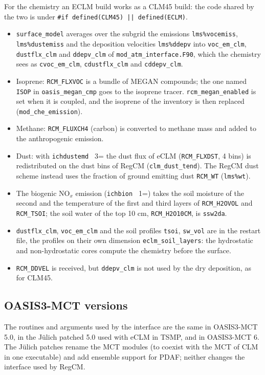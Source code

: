 For the chemistry an ECLM build works as a CLM45 build: the code shared by
the two is under \verb=#if defined(CLM45) || defined(ECLM)=.
\begin{itemize}
  \item \verb=surface_model= averages over the subgrid the emissions
        \verb=lms%vocemiss=, \verb=lms%dustemiss= and the deposition
        velocities \verb=lms%ddepv= into \verb=voc_em_clm=,
        \verb=dustflx_clm= and \verb=ddepv_clm= of
        \verb=mod_atm_interface.F90=, which the chemistry sees as
        \verb=cvoc_em_clm=, \verb=cdustflx_clm= and \verb=cddepv_clm=.
  \item Isoprene: \verb=RCM_FLXVOC= is a bundle of MEGAN compounds; the one
        named \verb=ISOP= in \verb=oasis_megan_cmp= goes to the isoprene
        tracer. \verb=rcm_megan_enabled= is set when it is coupled, and the
        isoprene of the inventory is then replaced (\verb=mod_che_emission=).
  \item Methane: \verb=RCM_FLUXCH4= (carbon) is converted to methane mass
        and added to the anthropogenic emission.
  \item Dust: with \verb=ichdustemd = 3= the dust flux of eCLM
        (\verb=RCM_FLXDST=, 4 bins) is redistributed on the dust bins of
        RegCM (\verb=clm_dust_tend=). The RegCM dust scheme instead uses the
        fraction of ground emitting dust \verb=RCM_WT= (\verb=lms%wt=).
  \item The biogenic NO$_x$ emission (\verb=ichbion = 1=) takes the soil
        moisture of the second and the temperature of the first and third
        layers of \verb=RCM_H2OVOL= and \verb=RCM_TSOI=; the soil water of
        the top 10 cm, \verb=RCM_H2O10CM=, is \verb=ssw2da=.
  \item \verb=dustflx_clm=, \verb=voc_em_clm= and the soil profiles
        \verb=tsoi=, \verb=sw_vol= are in the restart file, the profiles on
        their own dimension \verb=eclm_soil_layers=: the hydrostatic and
        non-hydrostatic cores compute the chemistry before the surface.
  \item \verb=RCM_DDVEL= is received, but \verb=ddepv_clm= is not used by
        the dry deposition, as for CLM45.
\end{itemize}

\subsection{OASIS3-MCT versions}

The routines and arguments used by the interface are the same in
OASIS3-MCT 5.0, in the J\"ulich patched 5.0 used with eCLM in TSMP, and in
OASIS3-MCT 6. The J\"ulich patches rename the MCT
modules (to coexist with the MCT of CLM in one executable) and add
ensemble support for PDAF; neither changes the interface used by RegCM.
